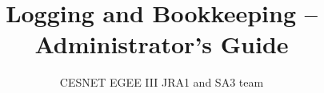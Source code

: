 \documentclass{emi}
\title{Logging and Bookkeeping -- Administrator's Guide}
\author{CESNET EGEE III JRA1 and SA3 team}
\begin{document}
%


\newpage
\tableofcontents

\newpage


\newpage


\newpage


%

\newpage


\newpage


\newpage


\newpage
\nocite{jgc}


\end{document}

